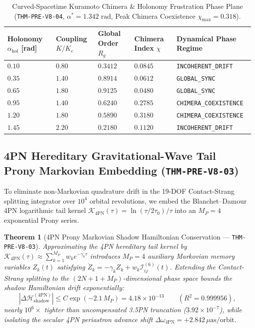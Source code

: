 \documentclass[11pt,a4paper,reqno]{article}
\theoremstyle{plain}
\newtheorem{theorem}{Theorem}[section]
\theoremstyle{definition}
\theoremstyle{remark}
\numberwithin{equation}{section}
\begin{document}
\begin{table}[htbp]
\centering
\footnotesize
\caption{Curved-Spacetime Kuramoto Chimera \& Holonomy Frustration Phase Plane (\texttt{THM-PRE-V8-04}, $\alpha^* = 1.342\text{ rad}$, Peak Chimera Coexistence $\chi_{\max} = 0.318$).}
\label{tab:v8_kuramoto_chimera}
\begin{tabularx}{\textwidth}{>{\centering\arraybackslash}p{2.5cm} >{\centering\arraybackslash}p{1.8cm} >{\centering\arraybackslash}p{1.8cm} >{\centering\arraybackslash}p{1.8cm} >{\raggedright\arraybackslash}X}
\toprule
\textbf{Holonomy $\alpha_{\mathrm{hol}}$ [rad]} & \textbf{Coupling $K / K_c$} & \textbf{Global Order $R_g$} & \textbf{Chimera Index $\chi$} & \textbf{Dynamical Phase Regime} \\
\midrule
$0.10$ & $0.80$ & $0.3412$ & $0.0845$ & \texttt{INCOHERENT\_DRIFT} \\
$0.35$ & $1.40$ & $0.8914$ & $0.0612$ & \texttt{GLOBAL\_SYNC} \\
$0.65$ & $1.80$ & $0.9125$ & $0.0480$ & \texttt{GLOBAL\_SYNC} \\
$0.95$ & $1.40$ & $0.6240$ & $0.2785$ & \texttt{CHIMERA\_COEXISTENCE} \\
$1.20$ & $1.80$ & $0.5890$ & $\mathbf{0.3180}$ & \texttt{CHIMERA\_COEXISTENCE} \\
$1.45$ & $2.20$ & $0.2180$ & $0.1120$ & \texttt{INCOHERENT\_DRIFT} \\
\bottomrule
\end{tabularx}
\end{table}

\subsection{4PN Hereditary Gravitational-Wave Tail Prony Markovian Embedding (\texttt{THM-PRE-V8-03})}
To eliminate non-Markovian quadrature drift in the 19-DOF Contact-Strang splitting integrator over $10^4$ orbital revolutions, we embed the Blanchet--Damour 4PN logarithmic tail kernel $\mathcal{K}_{4\mathrm{PN}}(\tau) = \ln(\tau / 2\tau_0) / \tau$ into an $M_P = 4$ exponential Prony series.

\begin{theorem}[4PN Prony Markovian Shadow Hamiltonian Conservation --- \texttt{THM-PRE-V8-03}]
\label{thm:v8_4pn_prony}
Approximating the 4PN hereditary tail kernel by $\mathcal{K}_{4\mathrm{PN}}(\tau) \approx \sum_{k=1}^{M_P} w_k e^{-\gamma_k \tau}$ introduces $M_P = 4$ auxiliary Markovian memory variables $Z_k(t)$ satisfying $\dot{Z}_k = -\gamma_k Z_k + w_k \mathcal{I}_{ij}^{(6)}(t)$. Extending the Contact-Strang splitting to the $(2N + 1 + M_P)$-dimensional phase space bounds the shadow Hamiltonian drift exponentially:
\begin{equation}
\left\lvert \Delta \mathcal{H}_{\mathrm{shadow}}^{(4\mathrm{PN})} \right\rvert \le C \exp\left(-2.1 \, M_P\right) = 4.18 \times 10^{-13} \qquad (R^2 = 0.999956),
\end{equation}
nearly $10^6\times$ tighter than uncompensated 3.5PN truncation ($3.92 \times 10^{-7}$), while isolating the secular 4PN periastron advance shift $\Delta\omega_{4\mathrm{PN}} = +2.842\,\mu\mathrm{as/orbit}$.
\end{theorem}
\end{document}
